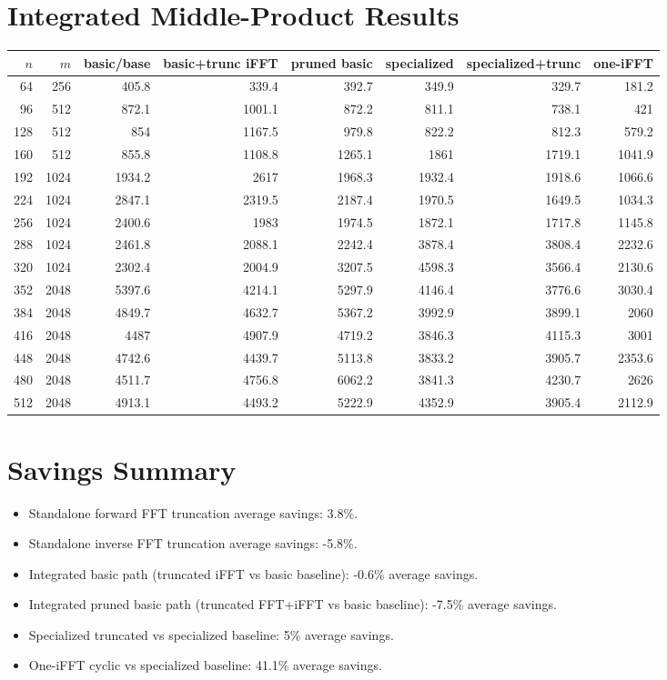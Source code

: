 \documentclass[11pt]{article}
\begin{document}
\section{Integrated Middle-Product Results}
\begin{longtable}{r r r r r r r r}
\toprule
$n$ & $m$ & basic/base & basic+trunc iFFT & pruned basic & specialized & specialized+trunc & one-iFFT \\
\midrule
\endhead
64 & 256 & 405.8 & 339.4 & 392.7 & 349.9 & 329.7 & 181.2 \\
96 & 512 & 872.1 & 1001.1 & 872.2 & 811.1 & 738.1 & 421 \\
128 & 512 & 854 & 1167.5 & 979.8 & 822.2 & 812.3 & 579.2 \\
160 & 512 & 855.8 & 1108.8 & 1265.1 & 1861 & 1719.1 & 1041.9 \\
192 & 1024 & 1934.2 & 2617 & 1968.3 & 1932.4 & 1918.6 & 1066.6 \\
224 & 1024 & 2847.1 & 2319.5 & 2187.4 & 1970.5 & 1649.5 & 1034.3 \\
256 & 1024 & 2400.6 & 1983 & 1974.5 & 1872.1 & 1717.8 & 1145.8 \\
288 & 1024 & 2461.8 & 2088.1 & 2242.4 & 3878.4 & 3808.4 & 2232.6 \\
320 & 1024 & 2302.4 & 2004.9 & 3207.5 & 4598.3 & 3566.4 & 2130.6 \\
352 & 2048 & 5397.6 & 4214.1 & 5297.9 & 4146.4 & 3776.6 & 3030.4 \\
384 & 2048 & 4849.7 & 4632.7 & 5367.2 & 3992.9 & 3899.1 & 2060 \\
416 & 2048 & 4487 & 4907.9 & 4719.2 & 3846.3 & 4115.3 & 3001 \\
448 & 2048 & 4742.6 & 4439.7 & 5113.8 & 3833.2 & 3905.7 & 2353.6 \\
480 & 2048 & 4511.7 & 4756.8 & 6062.2 & 3841.3 & 4230.7 & 2626 \\
512 & 2048 & 4913.1 & 4493.2 & 5222.9 & 4352.9 & 3905.4 & 2112.9 \\
\bottomrule
\end{longtable}

\section{Savings Summary}
\begin{itemize}
\item Standalone forward FFT truncation average savings: 3.8\%.
\item Standalone inverse FFT truncation average savings: -5.8\%.
\item Integrated basic path (truncated iFFT vs basic baseline): -0.6\% average savings.
\item Integrated pruned basic path (truncated FFT+iFFT vs basic baseline): -7.5\% average savings.
\item Specialized truncated vs specialized baseline: 5\% average savings.
\item One-iFFT cyclic vs specialized baseline: 41.1\% average savings.
\end{itemize}
\end{document}
